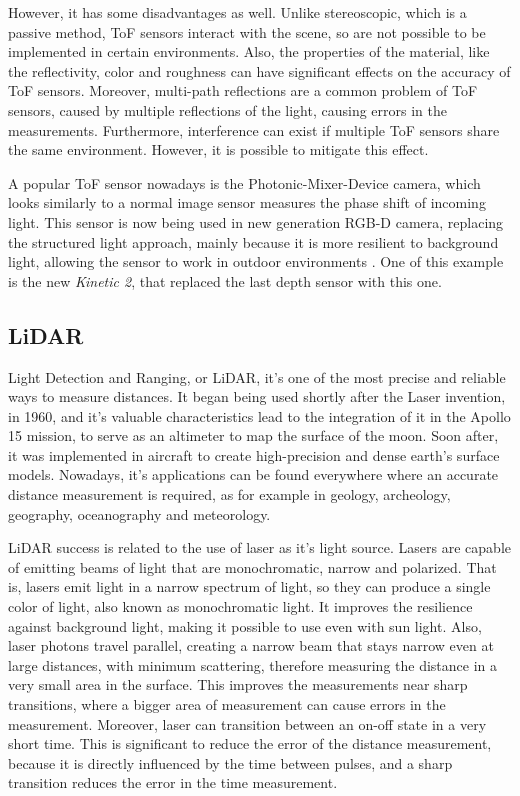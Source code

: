 However, it has some disadvantages as well. Unlike stereoscopic, which is a passive method, ToF sensors interact with the scene, so are not possible to be implemented in certain environments. Also, the properties of the material, like the reflectivity, color and roughness can have significant effects on the accuracy of ToF sensors. Moreover, multi-path reflections are a common problem of ToF sensors, caused by multiple reflections of the light, causing errors in the measurements. Furthermore, interference can exist if multiple ToF sensors share the same environment. However, it is possible to mitigate this effect.

A popular ToF sensor nowadays is the Photonic-Mixer-Device camera, which looks similarly to a normal image sensor measures the phase shift of incoming light. This sensor is now being used in new generation RGB-D camera, replacing the structured light approach, mainly because it is more resilient to background light, allowing the sensor to work in outdoor environments \cite{zollhoefer2018}. One of this example is the new \textit{Kinetic 2}, that replaced the last depth sensor with this one.

\subsection{LiDAR}

Light Detection and Ranging, or LiDAR, it's one of the most precise and reliable ways to measure distances. It began being used shortly after the Laser invention, in 1960, and it's valuable characteristics lead to the integration of it in the Apollo 15 mission, to serve as an altimeter to map the surface of the moon. Soon after, it was implemented in aircraft to create high-precision and dense earth's surface models. Nowadays, it's applications can be found everywhere where an accurate distance measurement is required, as for example in geology, archeology, geography, oceanography and meteorology.

LiDAR success is related to the use of laser as it's light source. Lasers are capable of emitting beams of light that are monochromatic, narrow and polarized. That is, lasers emit light in a narrow spectrum of light, so they can produce a single color of light, also known as monochromatic light. It improves the resilience against background light, making it possible to use even with sun light. Also, laser photons travel parallel, creating a narrow beam that stays narrow even at large distances, with minimum scattering, therefore measuring the distance in a very small area in the surface. This improves the measurements near sharp transitions, where a bigger area of measurement can cause errors in the measurement. Moreover, laser can transition between an on-off state in a very short time. This is significant to reduce the error of the distance measurement, because it is directly influenced by the time between pulses, and a sharp transition reduces the error in the time measurement. 

